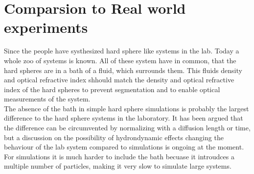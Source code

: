\section{Comparsion to Real world experiments} 
\label{sec:comparison}
Since the  people have systhesized hard sphere like systems in the lab. Today a whole zoo of systems is known. All of these system have in common, that the hard spheres are in a bath of a fluid, which surrounds them. This fluids density and optical refractive index shhould match the density and optical refractive index of the hard spheres to prevent segmentation and to enable optical measurements of the system. \\

The absence of the bath in simple hard sphere simulations is probably the largest difference to the hard sphere systems in the laboratory. It has been argued that the difference can be circumvented by normalizing with a diffusion length or time, but a discussion on the possibility of hydrondynamic effects changing the behaviour of the lab system compared to simulations is ongoing at the moment.\\ 

For simulations it is much harder to include the bath becuase it introudces a multiple number of particles, making it very slow to simulate large systems.\\




